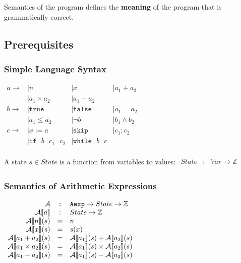 Semantics of the program defines the \textbf{meaning} of the program
that is grammatically correct.

\subsection{Prerequisites}

\subsubsection{Simple Language Syntax}

\begin{math}
  \begin{array}{llll}
    a \to & \mid n & \mid x & \mid a_1 + a_2 \\
          & \mid a_1 \times a_2 & \mid a_1 - a_2 \\
    b \to & \mid \mathtt{true} & \mid \mathtt{false} & \mid a_1 = a_2  \\
          & \mid a_1 \leq a_2 & \mid \neg b & \mid b_1 \land b_2 \\
    c \to & \mid x := a  & \mid \mathtt{skip} & \mid c_1 ; c_2 \\
          & \mid \mathtt{if} \text{ }b \text{ }c_1\text{ }c_2 & \mid \mathtt{while} \text{ }b \text{ }c \\
  \end{array}
\end{math}

A state $ s \in State $ is a function from variables to values:
\begin{math}
  \begin{array}{rcl}
    State & : & Var \to \mathbb{Z} \\
  \end{array}
\end{math}


\subsubsection{Semantics of Arithmetic Expressions}

\begin{math}
  \begin{array}{rcl}
    \mathcal{A} & : & \mathtt{Aexp} \to State \to \mathbb{Z} \\
    \mathcal{A} \llbracket  a  \rrbracket & : & State \to \mathbb{Z} \\
    \mathcal{A} \llbracket  n  \rrbracket (s) & = & n \\
    \mathcal{A} \llbracket  x  \rrbracket (s) & = & s(x) \\
    \mathcal{A} \llbracket  a_1 + a_2  \rrbracket (s) & = & \mathcal{A} \llbracket  a_1  \rrbracket (s) + \mathcal{A} \llbracket  a_2  \rrbracket (s) \\
    \mathcal{A} \llbracket  a_1 \times a_2  \rrbracket (s) & = & \mathcal{A} \llbracket  a_1  \rrbracket (s) \times \mathcal{A} \llbracket  a_2  \rrbracket (s) \\
    \mathcal{A} \llbracket  a_1 - a_2  \rrbracket (s) & = & \mathcal{A} \llbracket  a_1  \rrbracket (s) - \mathcal{A} \llbracket  a_2  \rrbracket (s) \\
  \end{array}
\end{math}

